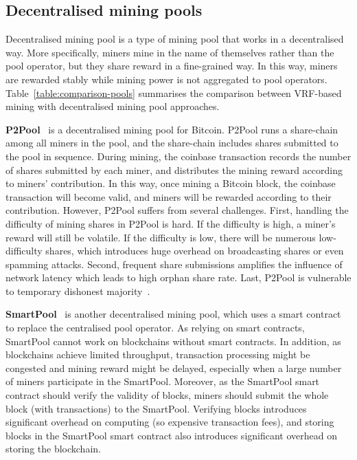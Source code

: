 \subsection{Decentralised mining pools}




Decentralised mining pool is a type of mining pool that works in a decentralised way.
More specifically, miners mine in the name of themselves rather than the pool operator, but they share reward in a fine-grained way.
In this way, miners are rewarded stably while mining power is not aggregated to pool operators.
Table~\ref{table:comparison-pools} summarises the comparison between VRF-based mining with decentralised mining pool approaches.


\textbf{P2Pool}~\cite{voight2011p2pool} is a decentralised mining pool for Bitcoin.
P2Pool runs a share-chain among all miners in the pool, and the share-chain includes shares submitted to the pool in sequence.
During mining, the coinbase transaction records the number of shares submitted by each miner, and distributes the mining reward according to miners' contribution.
In this way, once mining a Bitcoin block, the coinbase transaction will become valid, and miners will be rewarded according to their contribution.
However, P2Pool suffers from several challenges.
First, handling the difficulty of mining shares in P2Pool is hard.
If the difficulty is high, a miner's reward will still be volatile.
If the difficulty is low, there will be numerous low-difficulty shares, which introduces huge overhead on broadcasting shares or even spamming attacks.
Second, frequent share submissions amplifies the influence of network latency which leads to high orphan share rate.
Last, P2Pool is vulnerable to temporary dishonest majority~\cite{decentralised-mining-pool-security}.

\textbf{SmartPool}~\cite{luu2017smartpool} is another decentralised mining pool, which uses a smart contract to replace the centralised pool operator.
As relying on smart contracts, SmartPool cannot work on blockchains without smart contracts.
In addition, as blockchains achieve limited throughput, transaction processing might be congested and mining reward might be delayed, especially when a large number of miners participate in the SmartPool.
Moreover, as the SmartPool smart contract should verify the validity of blocks, miners should submit the whole block (with transactions) to the SmartPool.
Verifying blocks introduces significant overhead on computing (so expensive transaction fees), and storing blocks in the SmartPool smart contract also introduces significant overhead on storing the blockchain.



